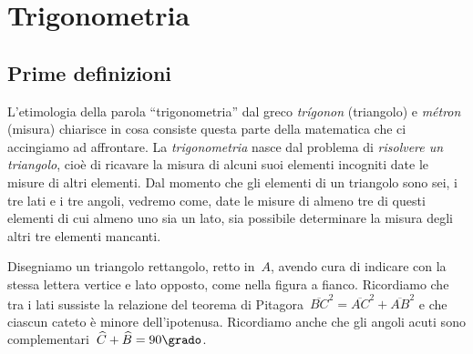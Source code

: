 \chapter{Trigonometria}

\section{Prime definizioni}
\label{sec:trigo_primedef}

L'etimologia della parola ``trigonometria'' dal greco \emph{trígonon} 
(triangolo) e \emph{métron} (misura) chiarisce in cosa consiste
questa parte della matematica che ci accingiamo ad affrontare.
La \emph{trigonometria} nasce dal problema di \emph{risolvere un triangolo}, 
cioè di ricavare la misura di alcuni suoi elementi incogniti date
le misure di altri elementi. Dal momento che gli elementi di un triangolo 
sono 
sei, i tre lati e i tre angoli, vedremo come, date le misure di
almeno tre di questi elementi di cui almeno uno sia un lato, sia possibile 
determinare la misura degli altri tre elementi mancanti.

\begin{multicols}{2}
 Disegniamo un triangolo rettangolo, retto in~\(A\), avendo cura di indicare 
con 
la stessa lettera vertice e lato opposto, come nella figura a fianco.
Ricordiamo che tra i lati sussiste la relazione del teorema di 
Pitagora~\(\overline{BC}^{2}=\overline{AC}^{2}+\overline{AB}^{2}\) e che 
ciascun 
cateto
è minore dell'ipotenusa. Ricordiamo anche che gli angoli acuti sono 
complementari~\(\widehat {C}+\widehat {B}=90\grado\).
\begin{inaccessibleblock}
\begin{center}\scalebox{1.0}{\triretta}\end{center}
% 
\end{inaccessibleblock}
\end{multicols}

